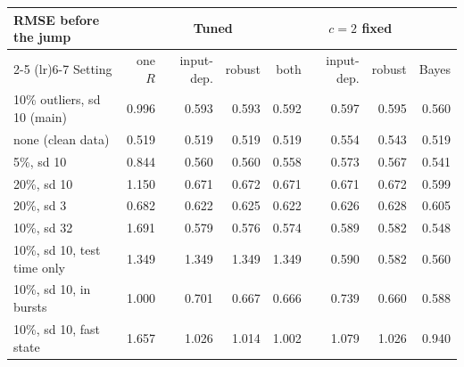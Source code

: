 \small
\setlength{\tabcolsep}{4pt}
\begin{tabular}{@{}lrrrrrrr@{}}
\toprule
RMSE before the jump & \multicolumn{4}{c}{Tuned} & \multicolumn{2}{c}{$c = 2$ fixed} & \\
\cmidrule(lr){2-5} \cmidrule(lr){6-7}
Setting & one $R$ & input-dep. & robust & both & input-dep. & robust & Bayes \\
\midrule
10\% outliers, sd 10 (main) & 0.996 & 0.593 & 0.593 & 0.592 & 0.597 & 0.595 & 0.560 \\
none (clean data) & 0.519 & 0.519 & 0.519 & 0.519 & 0.554 & 0.543 & 0.519 \\
5\%, sd 10 & 0.844 & 0.560 & 0.560 & 0.558 & 0.573 & 0.567 & 0.541 \\
20\%, sd 10 & 1.150 & 0.671 & 0.672 & 0.671 & 0.671 & 0.672 & 0.599 \\
20\%, sd 3 & 0.682 & 0.622 & 0.625 & 0.622 & 0.626 & 0.628 & 0.605 \\
10\%, sd 32 & 1.691 & 0.579 & 0.576 & 0.574 & 0.589 & 0.582 & 0.548 \\
10\%, sd 10, test time only & 1.349 & 1.349 & 1.349 & 1.349 & 0.590 & 0.582 & 0.560 \\
10\%, sd 10, in bursts & 1.000 & 0.701 & 0.667 & 0.666 & 0.739 & 0.660 & 0.588 \\
10\%, sd 10, fast state & 1.657 & 1.026 & 1.014 & 1.002 & 1.079 & 1.026 & 0.940 \\
\bottomrule
\end{tabular}
